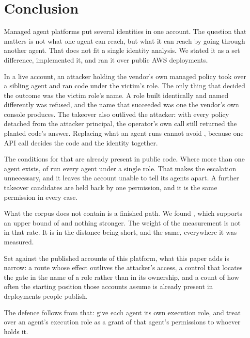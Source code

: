 \section{Conclusion}
\label{sec:conclusion}

Managed agent platforms put several identities in one account. The question
that matters is not what one agent can reach, but what it can reach by going
through another agent. That does not fit a single identity analysis. We stated
it as a set difference, implemented it, and ran it over public AWS
deployments.

In a live account, an attacker holding the vendor's own managed policy took
over a sibling agent and ran code under the victim's role. The only thing that
decided the outcome was the victim role's name. A role built identically and
named differently was refused, and the name that succeeded was one the
vendor's own console produces. The takeover also outlived the attacker: with
every policy detached from the attacker principal, the operator's own call
still returned the planted code's answer. Replacing what an agent runs cannot
avoid , because one API call decides the code and the
identity together.

The conditions for that are already present in public code. Where more than
one agent exists, \nSharedRoleRuntimes of \nMultiAgentRuntimes run every agent
under a single role. That makes the escalation unnecessary, and it leaves the
account unable to tell its agents apart. A further \nBlocked takeover
candidates are held back by one permission, and it is the same permission in
every case.

What the corpus does not contain is a finished path. We found \nChainsFound,
which supports an upper bound of \chainBound and nothing stronger. The
weight of the measurement is not in that rate. It is in the distance being
short, and the same, everywhere it was measured.

Set against the published accounts of this platform, what this paper adds is
narrow: a route whose effect outlives the attacker's
access, a control that locates the gate in the name of a role rather than in
its ownership, and a count of how often the starting position those accounts
assume is already present in deployments people publish.

The defence follows from that: give each agent its own execution role, and
treat  over an agent's execution role as a grant of that
agent's permissions to whoever holds it.


